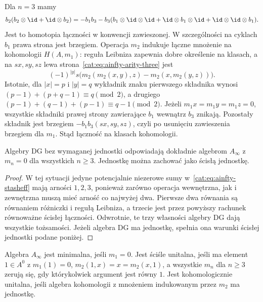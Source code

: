 Dla $n=3$ mamy
\begin{equation}\label{cat:eq:ainfty-arity-three}
 b_2(b_2\otimes\id+\id\otimes b_2)
 =-b_1b_3-b_3(b_1\otimes\id\otimes\id+
 \id\otimes b_1\otimes\id+\id\otimes\id\otimes b_1).
\end{equation}
Jest to homotopia łączności w konwencji zawieszonej. W szczególności na cyklach $b_1$ prawa strona jest brzegiem. Operacja $m_2$ indukuje łączne mnożenie na kohomologii $H(A,m_1)$: reguła Leibniza zapewnia dobre określenie na klasach, a na $sx,sy,sz$ lewa strona~\eqref{cat:eq:ainfty-arity-three} jest
\[
 (-1)^{|y|}s\bigl(m_2(m_2(x,y),z)-m_2(x,m_2(y,z))\bigr).
\]
Istotnie, dla $|x|=p$ i $|y|=q$ wykładnik znaku pierwszego składnika wynosi $(p-1)+(p+q-1)\equiv q\pmod2$, a drugiego $(p-1)+(q-1)+(p-1)\equiv q-1\pmod2$. Jeżeli $m_1x=m_1y=m_1z=0$, wszystkie składniki prawej strony zawierające $b_1$ wewnątrz $b_3$ znikają. Pozostały składnik jest brzegiem $-b_1b_3(sx,sy,sz)$, czyli po usunięciu zawieszenia brzegiem dla $m_1$. Stąd łączność na klasach kohomologii.

\begin{stwierdzenie}\label{cat:prop:ainfty-dg}
Algebry DG bez wymaganej jednostki odpowiadają dokładnie algebrom $A_\infty$ z $m_n=0$ dla wszystkich $n\geq3$. Jednostkę można zachować jako ścisłą jednostkę.
\end{stwierdzenie}
\begin{proof}
W tej sytuacji jedyne potencjalnie niezerowe sumy w~\eqref{cat:eq:ainfty-stasheff} mają arności $1,2,3$, ponieważ zarówno operacja wewnętrzna, jak i zewnętrzna muszą mieć arność co najwyżej dwa. Pierwsze dwa równania są równaniem różniczki i regułą Leibniza, a trzecie jest przez powyższy rachunek równoważne ścisłej łączności. Odwrotnie, te trzy własności algebry DG dają wszystkie tożsamości. Jeżeli algebra DG ma jednostkę, spełnia ona warunki ścisłej jednostki podane poniżej.
\end{proof}

\begin{definicja}\label{cat:def:ainfty-unit-minimal}
Algebra $A_\infty$ jest minimalna, jeśli $m_1=0$. Jest ściśle unitalna, jeśli ma element $1\in A^0$ z $m_1(1)=0$, $m_2(1,x)=x=m_2(x,1)$, a wszystkie $m_n$ dla $n\geq3$ zerują się, gdy którykolwiek argument jest równy $1$. Jest kohomologicznie unitalna, jeśli algebra kohomologii z mnożeniem indukowanym przez $m_2$ ma jednostkę.
\end{definicja}

